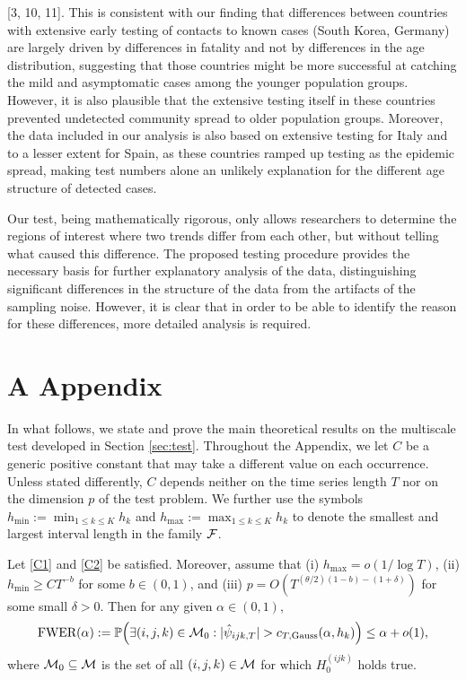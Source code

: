 \documentclass[a4paper,12pt]{article}
\numberwithin{equation}{section}
\begin{document}
 [3, 10, 11]. This is consistent with our finding that differences between
countries with extensive early testing of contacts to known cases (South Korea, Germany) are
largely driven by differences in fatality and not by differences in the age distribution, suggesting
that those countries might be more successful at catching the mild and asymptomatic cases
among the younger population groups. However, it is also plausible that the extensive testing
itself in these countries prevented undetected community spread to older population groups.
Moreover, the data included in our analysis is also based on extensive testing for Italy and to a
lesser extent for Spain, as these countries ramped up testing as the epidemic spread, making test
numbers alone an unlikely explanation for the different age structure of detected cases. 

Our test, being mathematically rigorous, only allows researchers to determine the regions of interest where two trends differ from each other, but without telling what caused this difference. The proposed testing procedure provides the necessary basis for further explanatory analysis of the data, distinguishing significant differences in the structure of the data from the artifacts of the sampling noise. However, it is clear that in order to be able to identify the reason for these differences, more detailed analysis is required.

\newpage

\section*{A \hspace{0.2cm} Appendix}
\def\theequation{A.\arabic{equation}}
\setcounter{equation}{0}

\enlargethispage{0.1cm}


In what follows, we state and prove the main theoretical results on the multiscale test developed in Section \ref{sec:test}. Throughout the Appendix, we let $C$ be a generic positive constant that may take a different value on each occurrence. Unless stated differently, $C$ depends neither on the time series length $T$ nor on the dimension $p$ of the test problem. We further use the symbols $h_{\min}:= \min_{1 \le k \le K} h_k$ and $h_{\max} := \max_{1 \le k \le K} h_k$ to denote the smallest and largest interval length in the family $\mathcal{F}$. 


\begin{theoremA}\label{theo1}
Let \ref{C1} and \ref{C2} be satisfied. Moreover, assume that (i) $h_{\max} = o(1/\log T)$, (ii) $h_{\min} \ge CT^{-b}$ for some $b \in (0,1)$, and (iii) $p = O(T^{(\theta/2)(1-b)-(1+\delta)})$ for some small $\delta > 0$. Then for any given $\alpha \in (0,1)$,
\[ \textnormal{FWER}(\alpha) := \mathbb{P} \Big( \exists (i,j,k) \in \mathcal{M}_0: |\hat{\psi}_{ijk,T}| > c_{T,\textnormal{Gauss}}(\alpha,h_k) \Big) \le \alpha + o(1), \]
where $\mathcal{M}_0 \subseteq \mathcal{M}$ is the set of all $(i,j,k) \in \mathcal{M}$ for which $H_0^{(ijk)}$ holds true. 
\end{theoremA}
\end{document}
